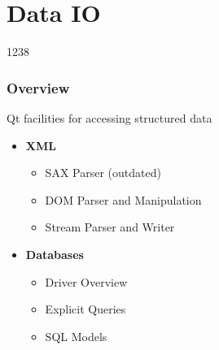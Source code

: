 %
%
%
%

\section{Data IO}

\begin{slide}{1238}\label{xml-processing}
\frametitle{Overview}

Qt facilities for accessing structured data

\begin{itemize}
\item \textbf{XML}
  \begin{itemize}
  \item SAX Parser (outdated)
  \item DOM Parser and Manipulation
  \item Stream Parser and Writer
  \end{itemize}
\item \textbf{Databases}
  \begin{itemize}
  \item Driver Overview
  \item Explicit Queries
  \item SQL Models
  \end{itemize}
\end{itemize}
\end{slide}




%
%

